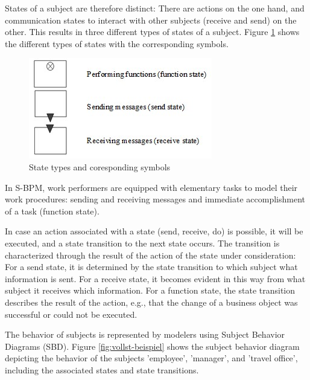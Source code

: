 States of a subject are therefore distinct: There are actions on the one hand, and communication states to interact with other subjects (receive and send) on the other. This results in three different types of states of a subject. Figure \ref{fig:behavior-symbole} shows the different types of states with the corresponding symbols.

\begin{figure}[htbp]
	\centering
	\includegraphics[width=0.5\linewidth]{Figures/Ontology/SubjectExecution/Behavior-Symbole}
	\caption[State types and coresponding symbols]{State types and coresponding symbols}
	\label{fig:behavior-symbole}
\end{figure}

In S-BPM, work performers are equipped with elementary tasks to model their work procedures: sending and receiving messages and immediate accomplishment of a task (function state).

In case an action associated with a state (send, receive, do) is possible, it will be executed, and a state transition to the next state occurs. The transition is characterized through the result of the action of the state under consideration: For a send state, it is determined by the state transition to which subject what information is sent. For a receive state, it becomes evident in this way from what subject it receives which information. For a function state, the state transition describes the result of the action, e.g., that the change of a business object was successful or could not be executed.

The behavior of subjects is represented by modelers using Subject Behavior Diagrams (SBD). Figure \ref{fig:vollst-beispiel} shows the subject behavior diagram depicting the behavior of the subjects 'employee', 'manager', and 'travel office', including the associated states and state transitions. 


